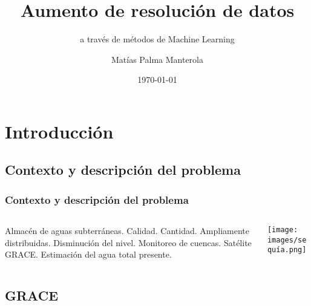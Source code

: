 \documentclass{beamer}
\title[Aumento de resolución a través del modelo \textit{Random Forest}] %
{Aumento de resolución de datos}
\subtitle{a través de métodos de Machine Learning  }
\author[] %
{Matías Palma Manterola}
\institute[UFRO] %
{
  Universidad de La Frontera
}
\date[] %
{\today}
\begin{document}
  \frame{\titlepage}

  \section{Introducción}

  \subsection*{Contexto y descripción del problema}

  \begin{frame}
    \frametitle{Contexto y descripción del problema}

    \begin{columns}

      \begin{column}{0.5\textwidth}
        \begin{outline}
          \1 {Almacén de aguas subterráneas.}
            \2 Calidad.
            \2 Cantidad.
            \2 Ampliamente distribuidas.
            \2 Disminución del nivel.
          \1 {Monitoreo de cuencas.}
          \1 {Satélite GRACE.}
            \2 Estimación del agua total presente.
        \end{outline}
      \end{column}

      \begin{column}{0.5\textwidth}
        \begin{center}
          \texttt{[image: images/sequía.png]}
        \end{center}
      \end{column}

    \end{columns}

  \end{frame}

  \subsection*{GRACE}
\end{document}
